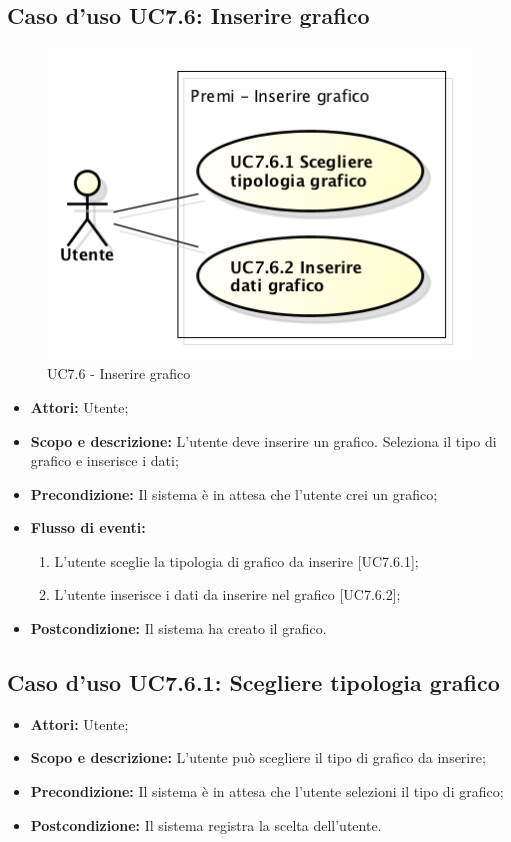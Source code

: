 \subsection{Caso d'uso UC7.6: Inserire grafico}
\begin{figure}[h] 
	\centering 
	\includegraphics[scale=0.45] {img/UC7.6.png} 
	\caption{UC7.6 - Inserire grafico} 
\end{figure}

\begin{itemize}
	\item \textbf{Attori:} Utente;
	\item \textbf{Scopo e descrizione:} L'utente deve inserire un grafico. Seleziona il tipo di grafico e inserisce i dati;
	\item \textbf{Precondizione:} Il sistema è in attesa che l'utente crei un grafico;
	\item \textbf{Flusso di eventi:}
	\begin{enumerate}
		\item L'utente sceglie la tipologia di grafico da inserire [UC7.6.1];
		\item L'utente inserisce i dati da inserire nel grafico [UC7.6.2];
	\end{enumerate}
	\item \textbf{Postcondizione:} Il sistema ha creato il grafico.
\end{itemize}

\subsection{Caso d'uso UC7.6.1: Scegliere tipologia grafico}
\begin{itemize}
	\item \textbf{Attori:} Utente;
	\item \textbf{Scopo e descrizione:} L'utente può scegliere il tipo di grafico da inserire;
	\item \textbf{Precondizione:} Il sistema è in attesa che l'utente selezioni il tipo di grafico;
	\item \textbf{Postcondizione:} Il sistema registra la scelta dell'utente.
\end{itemize}

